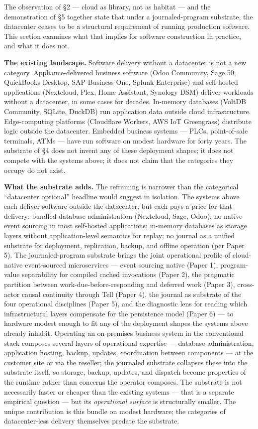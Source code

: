 \documentclass[
]{article}
\begin{document}
The observation of §2 --- cloud as library, not as habitat --- and the
demonstration of §5 together state that under a journaled-program
substrate, the datacenter ceases to be a structural requirement of
running production software. This section examines what that implies for
software construction in practice, and what it does not.

\textbf{The existing landscape.} Software delivery without a datacenter
is not a new category. Appliance-delivered business software (Odoo
Community, Sage 50, QuickBooks Desktop, SAP Business One, Splunk
Enterprise) and self-hosted applications (Nextcloud, Plex, Home
Assistant, Synology DSM) deliver workloads without a datacenter, in some
cases for decades. In-memory databases (VoltDB Community, SQLite,
DuckDB) run application data outside cloud infrastructure.
Edge-computing platforms (Cloudflare Workers, AWS IoT Greengrass)
distribute logic outside the datacenter. Embedded business systems ---
PLCs, point-of-sale terminals, ATMs --- have run software on modest
hardware for forty years. The substrate of §4 does not invent any of
these deployment shapes; it does not compete with the systems above; it
does not claim that the categories they occupy do not exist.

\textbf{What the substrate adds.} The reframing is narrower than the
categorical ``datacenter optional'' headline would suggest in isolation.
The systems above each deliver software outside the datacenter, but each
pays a price for that delivery: bundled database administration
(Nextcloud, Sage, Odoo); no native event sourcing in most self-hosted
applications; in-memory databases as storage layers without
application-level semantics for replay; no journal as a unified
substrate for deployment, replication, backup, and offline operation
(per Paper 5). The journaled-program substrate brings the joint
operational profile of cloud-native event-sourced microservices ---
event sourcing native (Paper 1), program-value separability for compiled
cached invocations (Paper 2), the pragmatic partition between
work-due-before-responding and deferred work (Paper 3), cross-actor
causal continuity through Tell (Paper 4), the journal as substrate of
the four operational disciplines (Paper 5), and the diagnostic lens for
reading which infrastructural layers compensate for the persistence
model (Paper 6) --- to hardware modest enough to fit any of the
deployment shapes the systems above already inhabit. Operating an
on-premises business system in the conventional stack composes several
layers of operational expertise --- database administration, application
hosting, backup, updates, coordination between components --- at the
customer site or via the reseller; the journaled substrate collapses
these into the substrate itself, so storage, backup, updates, and
dispatch become properties of the runtime rather than concerns the
operator composes. The substrate is not necessarily faster or cheaper
than the existing systems --- that is a separate empirical question ---
but its \emph{operational surface} is structurally smaller. The unique
contribution is this bundle on modest hardware; the categories of
datacenter-less delivery themselves predate the substrate.
\end{document}
